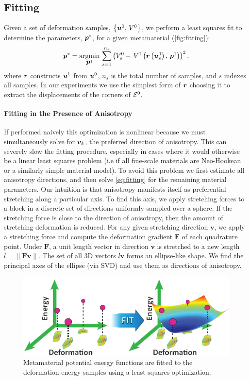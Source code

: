 \subsection{Fitting}
\label{sec:fitting}
Given a set of deformation samples, $\left\{ \mbox{$\bm{u}$}^0, \,V^0\right\}$, we perform a least squares fit to determine the parameters, $\mbox{$\bm{p}$}^*$, for a given metamaterial (\autoref{fig:fitting}):
\begin{align}
\mbox{$\bm{p}$}^*= \underset{\mbox{$\bm{p}$}^1}{\operatorname{argmin}} \, \sum_{s=1}^{n_s}\left(V_s^0- \, V^1\left(\mbox{$\bm{r}$}\left(\mbox{$\bm{u}$}_s^0\right), \, \mbox{$\bm{p}$}^1\right)\right)^2,
\label{eq:fitting}
\end{align}
where $\mbox{$\bm{r}$}$ constructs $\mbox{$\bm{u}$}^1$ from $\mbox{$\bm{u}$}^0$, $n_s$ is the total number of samples, and $s$ indexes all samples. In our experiments we use the simplest form of $\mbox{$\bm{r}$}$ choosing it to extract the displacements of the corners of $\mathcal{E}^0$.

\paragraph{Fitting in the Presence of Anisotropy}
If performed naively this optimization is nonlinear because we must simultaneously solve for $\mbox{$\bm{v}$}_k$, the preferred direction of anisotropy. This can severely slow the fitting procedure, especially in cases where it would otherwise be a linear least squares problem (i.e if all fine-scale materials are Neo-Hookean or a similarly simple material model).
To avoid this problem we first estimate all anisotropy directions, and then solve \autoref{eq:fitting} for the remaining material parameters.
Our intuition is that anisotropy manifests itself as preferential stretching along a particular axis. To find this axis, we apply stretching forces to a block in a discrete set of directions uniformly sampled over a sphere.
If the stretching force is close to the direction of anisotropy, then the amount of stretching deformation is reduced.
For any given stretching direction $\mathbf{v}$, we apply a stretching force and compute the deformation gradient $\mathbf{F}$ of  each quadrature point.
Under $\mathbf{F}$, a unit length vector in direction $\mathbf{v}$ is stretched to a new length $l = \|\mathbf{F}\mathbf{v}\|$.
The set of all 3D vectors $l\mathbf{v}$ forms an ellipse-like shape.
We find the principal axes of the ellipse (via SVD) and use them as directions of anisotropy.
\begin{figure}
	\centering
	\includegraphics[width=0.6\columnwidth]{images/fitting.pdf}
	\caption{ Metamaterial potential energy functions are fitted to the deformation-energy samples using a least-squares optimization.}
	\label{fig:fitting}
\end{figure}
